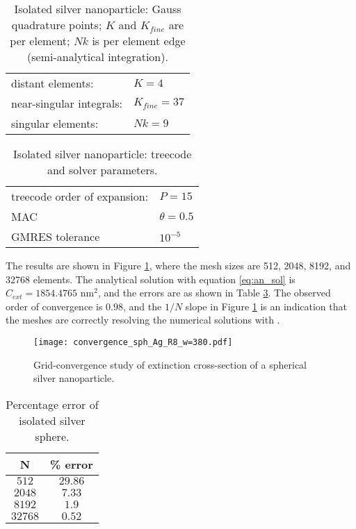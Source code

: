 \begin{table}[h]
    \centering
    \caption{\label{table:quadparams1} Isolated silver nanoparticle: Gauss quadrature points; 
    $K$ and $K_{fine}$ are per element; $Nk $ is per element edge (semi-analytical integration). } 
    \begin{tabular}{l l}
    \hline%
     distant elements: & $K=4$ \\
     near-singular integrals:   & $ K_{fine}=37$ \\
     singular elements:  & $Nk =9$ \\
    \hline%
    \end{tabular}
\end{table}


\begin{table}[h]
    \centering
    \caption{\label{table:treeparams1} Isolated silver nanoparticle: treecode and solver parameters.} 
    \begin{tabular}{l l}
    \hline%
    treecode order of expansion: & $P=15$\\
    MAC                                         & $\theta=0.5$\\
    GMRES tolerance                    & $10^{-5}$\\
    \hline%
    \end{tabular}
\end{table}

The results are shown in Figure \ref{fig:error_sphere_Ag}, where the mesh sizes are
512, 2048, 8192, and 32768 elements. 
The analytical solution with equation \eqref{eq:an_sol} is $C_{ext} = 1854.4765$ nm$^2$, 
and the errors are as shown in Table \ref{table:err_iso_sphere}.
The observed order of convergence is $0.98$, and the $1/N$ slope in Figure \ref{fig:error_sphere_Ag}
is an indication that the meshes are correctly resolving the numerical solutions with \pygbe. 


\begin{figure}[h] %
   \centering
   \texttt{[image: convergence\_sph\_Ag\_R8\_w=380.pdf]} 
   \caption{Grid-convergence study of extinction cross-section of a spherical silver
            nanoparticle.}
   \label{fig:error_sphere_Ag}
\end{figure}



\begin{table}[h]
    \centering
    \caption{\label{table:err_iso_sphere} Percentage error of isolated silver sphere.} 
    \begin{tabular}{c c}
    \hline%
    N & \% error \\
    \hline%
     $512$ & $29.86$ \\
     $2048$ & $7.33$ \\
     $8192$ & $1.9$ \\
     $32768$ & $0.52$ \\
    \hline%
    \end{tabular}
\end{table}

